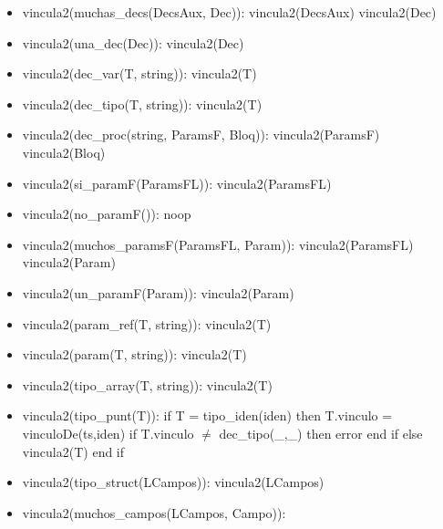 \documentclass[11pt]{article}
\begin{document}
            \begin{itemize}
                \item vincula2(muchas\_decs(DecsAux, Dec)):
                    \subitem vincula2(DecsAux)
                    \subitem vincula2(Dec)
                \item vincula2(una\_dec(Dec)):
                    \subitem vincula2(Dec)
                \item vincula2(dec\_var(T, string)):
                    \subitem vincula2(T)
                \item vincula2(dec\_tipo(T, string)):
                    \subitem vincula2(T)
                \item vincula2(dec\_proc(string, ParamsF, Bloq)):
                    \subitem vincula2(ParamsF)
                    \subitem vincula2(Bloq)
                \item vincula2(si\_paramF(ParamsFL)):
                    \subitem vincula2(ParamsFL)
                \item vincula2(no\_paramF()):
                    \subitem noop
                \item vincula2(muchos\_paramsF(ParamsFL, Param)):
                    \subitem vincula2(ParamsFL)
                    \subitem vincula2(Param)
                \item vincula2(un\_paramF(Param)): 
                    \subitem vincula2(Param) 
                \item vincula2(param\_ref(T, string)): 
                    \subitem vincula2(T) 
                \item vincula2(param(T, string)): 
                    \subitem vincula2(T)
                \item vincula2(tipo\_array(T, string)): 
                    \subitem vincula2(T)
                \item vincula2(tipo\_punt(T)): 
                    \subitem if T = tipo\_iden(iden) then 
                        \subsubitem T.vinculo = vinculoDe(ts,iden)
                        \subsubitem if T.vinculo $\neq$ dec\_tipo(\_,\_) then
                            \subsubitem \hspace{2em} error
                        \subsubitem end if
                    \subitem else
                        \subsubitem vincula2(T)
                    \subitem end if
                \item vincula2(tipo\_struct(LCampos)): 
                    \subitem vincula2(LCampos)
                \item vincula2(muchos\_campos(LCampos, Campo)): 

\end{itemize}
\end{document}
